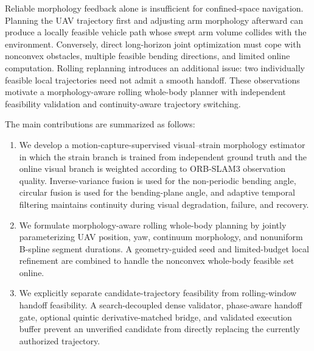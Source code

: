 \documentclass[journal,twoside]{IEEEtran}
\begin{document}
Reliable morphology feedback alone is insufficient for confined-space navigation. Planning the UAV trajectory first and adjusting arm morphology afterward can produce a locally feasible vehicle path whose swept arm volume collides with the environment. Conversely, direct long-horizon joint optimization must cope with nonconvex obstacles, multiple feasible bending directions, and limited online computation. Rolling replanning introduces an additional issue: two individually feasible local trajectories need not admit a smooth handoff. These observations motivate a morphology-aware rolling whole-body planner with independent feasibility validation and continuity-aware trajectory switching.

The main contributions are summarized as follows:
\begin{enumerate}
    \item We develop a motion-capture-supervised visual--strain morphology estimator in which the strain branch is trained from independent ground truth and the online visual branch is weighted according to ORB-SLAM3 observation quality. Inverse-variance fusion is used for the non-periodic bending angle, circular fusion is used for the bending-plane angle, and adaptive temporal filtering maintains continuity during visual degradation, failure, and recovery.

    \item We formulate morphology-aware rolling whole-body planning by jointly parameterizing UAV position, yaw, continuum morphology, and nonuniform B-spline segment durations. A geometry-guided seed and limited-budget local refinement are combined to handle the nonconvex whole-body feasible set online.

    \item We explicitly separate candidate-trajectory feasibility from rolling-window handoff feasibility. A search-decoupled dense validator, phase-aware handoff gate, optional quintic derivative-matched bridge, and validated execution buffer prevent an unverified candidate from directly replacing the currently authorized trajectory.
\end{enumerate}
\end{document}
